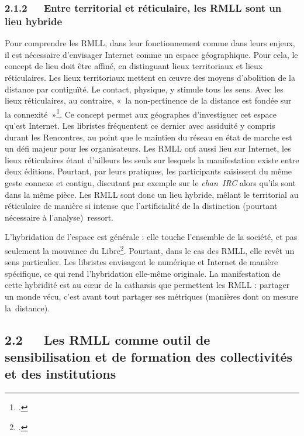 \documentclass{FramateX}
\begin{document}
\begin{refsection}
\subsubsection*{2.1.2~~~Entre territorial et réticulaire, les RMLL sont un lieu hybride}
{}

Pour comprendre les RMLL, dans leur fonctionnement comme dans leurs
enjeux, il est nécessaire d'envisager Internet comme un espace
géographique. Pour cela, le concept de lieu doit être affiné, en
distinguant lieux territoriaux et lieux réticulaires. Les lieux
territoriaux mettent en œuvre des moyens d'abolition de la distance par
contiguïté. Le contact, physique, y stimule tous les sens. Avec les
lieux réticulaires, au contraire, «~la
non-pertinence de la distance est fondée sur la
connexité~»\footnote{\cite[p.~191]{Beaude2008}.}. Ce concept permet aux géographes d'investiguer cet espace
qu'est Internet. Les libristes fréquentent ce dernier avec assiduité y
compris durant les Rencontres, au point que le maintien du réseau en
état de marche est un défi majeur pour les organisateurs. Les RMLL ont
aussi lieu sur Internet, les lieux réticulaires étant d'ailleurs les
seuls sur lesquels la manifestation existe entre deux éditions.
Pourtant, par leurs pratiques, les participants saisissent du même
geste connexe et contigu, discutant par exemple sur le \textit{chan~IRC}
alors qu'ils sont dans la même pièce. Les RMLL sont donc un lieu
hybride, mêlant le territorial au réticulaire de manière si intense que
l'artificialité de la distinction (pourtant nécessaire à
l'analyse)~ressort.

L'hybridation de l'espace est générale : elle touche l'ensemble de la
société, et pas seulement la mouvance du
Libre\footnote{\cite[p.~209]{beaudeinternet2012}.}. Pourtant, dans le cas des RMLL, elle revêt un sens
particulier. Les libristes envisagent le numérique et Internet de
manière spécifique, ce qui rend l'hybridation elle-même originale. La
manifestation de cette hybridité est au cœur de la catharsis que
permettent les RMLL : partager un monde vécu, c'est avant tout partager
ses métriques (manières dont on mesure la~distance).

\subsection*{2.2~~~Les RMLL comme outil de sensibilisation et de formation des collectivités et des institutions}
{}


\end{refsection}
\end{document}
